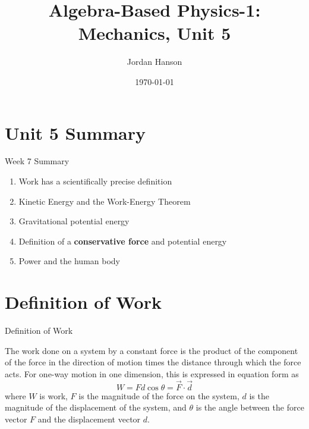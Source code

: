 \documentclass{beamer}
\title{Algebra-Based Physics-1: Mechanics, Unit 5}
\date{\today}
\author{Jordan Hanson}
\institute{Whittier College Department of Physics and Astronomy}
\begin{document}
\maketitle

\section{Unit 5 Summary}

\begin{frame}{Week 7 Summary}
\begin{enumerate}
\item \alert{Work} has a scientifically precise definition
\item Kinetic Energy and the \alert{Work-Energy Theorem}
\item Gravitational potential energy
\item Definition of a \textbf{conservative force} and potential energy
\item Power and the human body
\end{enumerate}
\end{frame}

\section{Definition of Work}

\begin{frame}{Definition of Work}
\begin{tcolorbox}[colback=white,colframe=red!40!blue,title=Definition of Work]
\small
\alert{
The work done on a system by a constant force is the product of the component of the force in the direction of motion times the distance through which the force acts.  For one-way motion in one dimension, this is expressed in equation form as 
\begin{equation}
W = Fd\cos\theta = \vec{F} \cdot \vec{d}
\end{equation}
where $W$ is work, $F$ is the magnitude of the force on the system, $d$ is the magnitude of the displacement of the system, and $\theta$ is the angle between the force vector $F$ and the displacement vector $d$.
}
\end{tcolorbox}
\end{frame}
\end{document}
